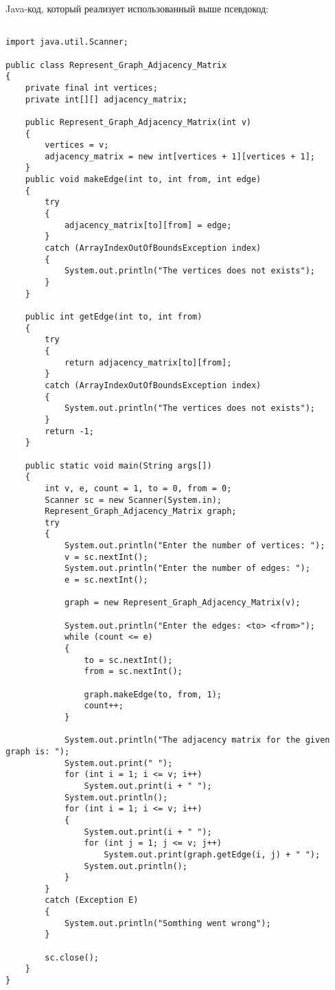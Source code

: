\vspace{\baselineskip}
Java-код, который реализует использованный выше псевдокод:
\begin{tcolorbox}
\begin{verbatim}

import java.util.Scanner;

public class Represent_Graph_Adjacency_Matrix
{
    private final int vertices;
    private int[][] adjacency_matrix;
    
    public Represent_Graph_Adjacency_Matrix(int v)
    {
        vertices = v;
        adjacency_matrix = new int[vertices + 1][vertices + 1];
    }
    public void makeEdge(int to, int from, int edge)
    {
        try
        {
            adjacency_matrix[to][from] = edge;
        }
        catch (ArrayIndexOutOfBoundsException index)
        {
            System.out.println("The vertices does not exists");
        }
    }
    
    public int getEdge(int to, int from)
    {
        try
        {
            return adjacency_matrix[to][from];
        }
        catch (ArrayIndexOutOfBoundsException index)
        {
            System.out.println("The vertices does not exists");
        }
        return -1;
    }
    
    public static void main(String args[])
    {
        int v, e, count = 1, to = 0, from = 0;
        Scanner sc = new Scanner(System.in);
        Represent_Graph_Adjacency_Matrix graph;
        try
        {
            System.out.println("Enter the number of vertices: ");
            v = sc.nextInt();
            System.out.println("Enter the number of edges: ");
            e = sc.nextInt();
            
            graph = new Represent_Graph_Adjacency_Matrix(v);
            
            System.out.println("Enter the edges: <to> <from>");
            while (count <= e)
            {
                to = sc.nextInt();
                from = sc.nextInt();
                
                graph.makeEdge(to, from, 1);
                count++;
            }
            
            System.out.println("The adjacency matrix for the given graph is: ");
            System.out.print(" ");
            for (int i = 1; i <= v; i++)
                System.out.print(i + " ");
            System.out.println();
            for (int i = 1; i <= v; i++)
            {
                System.out.print(i + " ");
                for (int j = 1; j <= v; j++)
                    System.out.print(graph.getEdge(i, j) + " ");
                System.out.println();
            }
        }
        catch (Exception E)
        {
            System.out.println("Somthing went wrong");
        }
        
        sc.close();
    }
}

\end{verbatim}
\end{tcolorbox}

